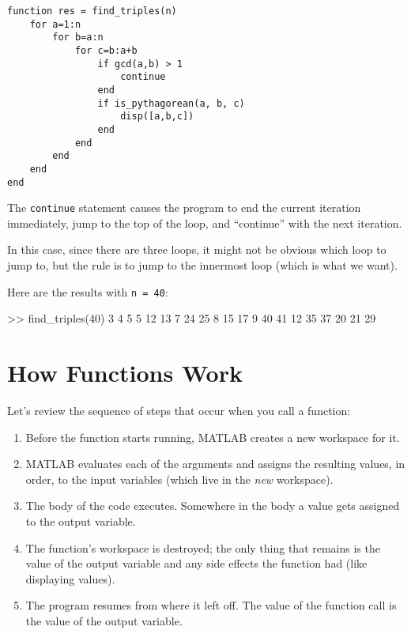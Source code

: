 \begin{lstlisting}[caption={Our final Pythagorean triples function}, label={lst:triples_function}] 
function res = find_triples(n)
    for a=1:n
        for b=a:n
            for c=b:a+b
                if gcd(a,b) > 1
	                continue
                end
                if is_pythagorean(a, b, c)
                    disp([a,b,c])
                end
            end
        end
    end
end
\end{lstlisting}

The \lstinline{continue} statement  causes the program to end the current iteration
immediately, jump to the top of the loop, and ``continue'' with the next iteration.

In this case, since there are three loops, it might not be obvious which loop to jump to, but the rule is to jump to the innermost loop (which is what we want).

Here are the results with \lstinline{n = 40}:

\begin{code}
>> find_triples(40)
     3     4     5
     5    12    13
     7    24    25
     8    15    17
     9    40    41
    12    35    37
    20    21    29
\end{code}


\section{How Functions Work}

Let's review the sequence of steps that occur when you call a function:

\begin{enumerate}

\item Before the function starts running, MATLAB creates a new
workspace for it.

\item MATLAB evaluates each of the arguments and assigns
the resulting values, in order, to the input variables (which
live in the \emph{new} workspace).

\item The body of the code executes.  Somewhere in the body
a value gets assigned to the output variable.

\item The function's workspace is destroyed; the only thing
that remains is the value of the output variable and any side
effects the function had (like displaying values).

\item The program resumes from where it left off.  The value
of the function call is the value of the output variable.

\end{enumerate}

